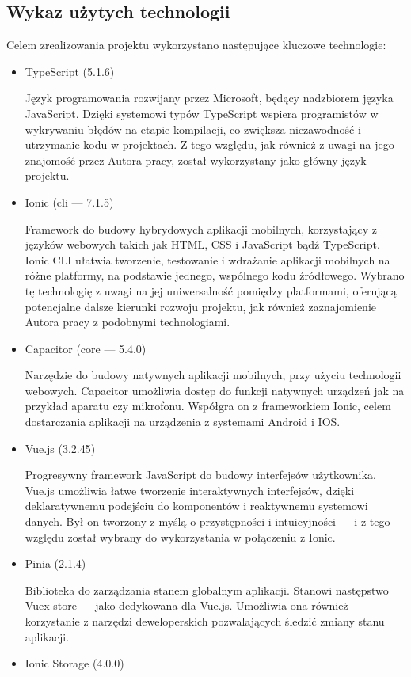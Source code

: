 \subsection{Wykaz użytych technologii}
Celem zrealizowania projektu wykorzystano następujące kluczowe technologie:
\begin{itemize}
	\item TypeScript (5.1.6)

	      Język programowania rozwijany przez Microsoft, będący nadzbiorem języka JavaScript.
	      Dzięki systemowi typów TypeScript wspiera programistów w wykrywaniu błędów na etapie kompilacji,
	      co zwiększa niezawodność i utrzymanie kodu w projektach. Z tego względu, jak również z uwagi na jego znajomość
	      przez Autora pracy, został wykorzystany jako główny język projektu.
	\item Ionic (cli — 7.1.5)

	      Framework do budowy hybrydowych aplikacji mobilnych, korzystający z języków webowych takich jak HTML,
	      CSS i JavaScript bądź TypeScript.
	      Ionic CLI ułatwia tworzenie, testowanie i wdrażanie aplikacji mobilnych na różne platformy, na podstawie jednego,
	      wspólnego kodu źródłowego.
	      Wybrano tę technologię z uwagi na jej uniwersalność pomiędzy platformami, oferującą potencjalne dalsze kierunki
	      rozwoju projektu, jak również zaznajomienie Autora pracy z podobnymi technologiami.
	\item Capacitor (core — 5.4.0)

	      Narzędzie do budowy natywnych aplikacji mobilnych, przy użyciu technologii webowych.
	      Capacitor umożliwia dostęp do funkcji natywnych urządzeń jak na przykład aparatu czy mikrofonu.
	      Współgra on z frameworkiem Ionic, celem dostarczania aplikacji na urządzenia z systemami Android i IOS.
	\item Vue.js (3.2.45)

	      Progresywny framework JavaScript do budowy interfejsów użytkownika.
	      Vue.js umożliwia łatwe tworzenie interaktywnych interfejsów, dzięki deklaratywnemu podejściu do komponentów i
	      reaktywnemu systemowi danych. Był on tworzony z myślą o przystępności i intuicyjności
	      — i z tego względu został wybrany do wykorzystania w połączeniu z Ionic.
	\item Pinia (2.1.4)

	      Biblioteka do zarządzania stanem globalnym aplikacji. Stanowi następstwo Vuex store — jako dedykowana dla
	      Vue.js. Umożliwia ona również korzystanie z narzędzi deweloperskich pozwalających śledzić zmiany stanu aplikacji.
	\item Ionic Storage (4.0.0)


\end{itemize}
